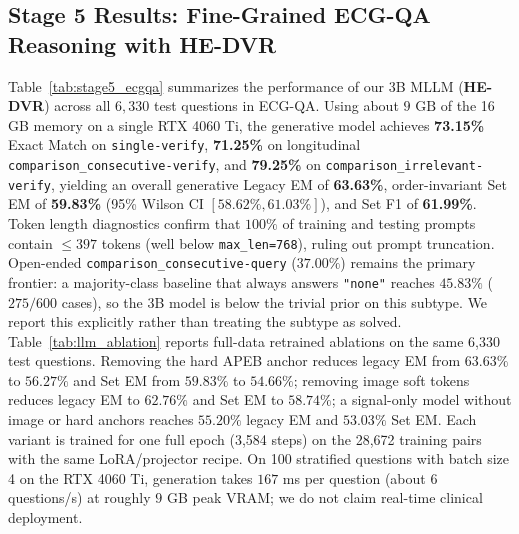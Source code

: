 \documentclass[preprint,12pt]{elsarticle}
\begin{document}
\subsection{Stage 5 Results: Fine-Grained ECG-QA Reasoning with HE-DVR}
Table~\ref{tab:stage5_ecgqa} summarizes the performance of our 3B MLLM (\textbf{HE-DVR}) across all $6,330$ test questions in ECG-QA. Using about $9\text{ GB}$ of the 16 GB memory on a single RTX 4060 Ti, the generative model achieves \textbf{73.15\%} Exact Match on \texttt{single-verify}, \textbf{71.25\%} on longitudinal \texttt{comparison\_consecutive-verify}, and \textbf{79.25\%} on \texttt{comparison\_irrelevant-verify}, yielding an overall generative Legacy EM of \textbf{63.63\%}, order-invariant Set EM of \textbf{59.83\%} (95\% Wilson CI $[58.62\%,61.03\%]$), and Set F1 of \textbf{61.99\%}. Token length diagnostics confirm that $100\%$ of training and testing prompts contain $\le 397$ tokens (well below \texttt{max\_len=768}), ruling out prompt truncation. Open-ended \texttt{comparison\_consecutive-query} ($37.00\%$) remains the primary frontier: a majority-class baseline that always answers \texttt{"none"} reaches $45.83\%$ ($275/600$ cases), so the 3B model is below the trivial prior on this subtype. We report this explicitly rather than treating the subtype as solved. Table~\ref{tab:llm_ablation} reports full-data retrained ablations on the same 6,330 test questions. Removing the hard APEB anchor reduces legacy EM from $63.63\%$ to $56.27\%$ and Set EM from $59.83\%$ to $54.66\%$; removing image soft tokens reduces legacy EM to $62.76\%$ and Set EM to $58.74\%$; a signal-only model without image or hard anchors reaches $55.20\%$ legacy EM and $53.03\%$ Set EM. Each variant is trained for one full epoch (3,584 steps) on the 28,672 training pairs with the same LoRA/projector recipe. On 100 stratified questions with batch size 4 on the RTX 4060 Ti, generation takes $167$ ms per question (about $6$ questions/s) at roughly $9$ GB peak VRAM; we do not claim real-time clinical deployment.

\begin{table}[htbp]
\centering
\caption{Full-data retrained HE-DVR ablations on the 6,330-question ECG-QA test set. All variants use one epoch (3,584 steps) and the same LoRA/projector recipe.}
\label{tab:llm_ablation}
\end{table}
\end{document}
